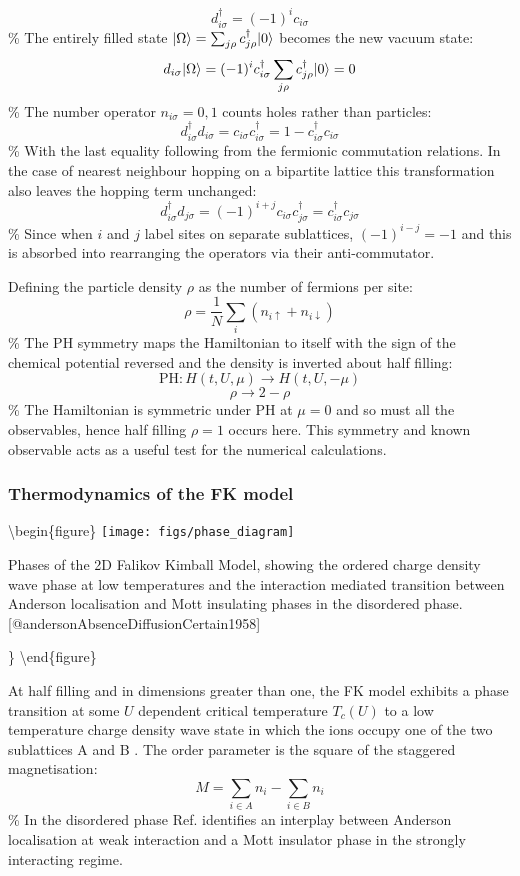 \[ d^\dagger_{i\sigma} = (-1)^i c_{i\sigma}\] \% The entirely filled state \(|\Omega\rangle = \sum_{j\rho} c^\dagger_{j\rho} |0\rangle\) becomes the new vacuum state: \[d_{i\sigma} |\Omega\rangle = (-1)^i c^\dagger_{i\sigma} \sum_{j\rho} c^\dagger_{j\rho} |0\rangle = 0\] \% The number operator \(n_{i\sigma} = 0,1\) counts holes rather than particles: \[ d^\dagger_{i\sigma} d_{i \sigma} = c_{i\sigma} c^\dagger_{i\sigma} = 1 - c^\dagger_{i\sigma} c_{i\sigma}\] \% With the last equality following from the fermionic commutation relations. In the case of nearest neighbour hopping on a bipartite lattice this transformation also leaves the hopping term unchanged: \[ d^\dagger_{i\sigma} d_{j \sigma} = (-1)^{i+j} c_{i\sigma} c^\dagger_{j\sigma} = c^\dagger_{i\sigma} c_{j\sigma} \] \% Since when \(i\) and \(j\) label sites on separate sublattices, \((-1)^{i-j} = -1\) and this is absorbed into rearranging the operators via their anti-commutator.

Defining the particle density \(\rho\) as the number of fermions per site: \[
    \rho = \frac{1}{N} \sum_i \left( n_{i \uparrow} + n_{i \downarrow} \right)
\] \% The PH symmetry maps the Hamiltonian to itself with the sign of the chemical potential reversed and the density is inverted about half filling: \[ \text{PH} : H(t, U, \mu) \rightarrow H(t, U, -\mu) \] \[ \rho \rightarrow 2 - \rho \] \% The Hamiltonian is symmetric under PH at \(\mu = 0\) and so must all the observables, hence half filling \(\rho = 1\) occurs here. This symmetry and known observable acts as a useful test for the numerical calculations.

\hypertarget{thermodynamics-of-the-fk-model}{%
\subsubsection{Thermodynamics of the FK model}\label{thermodynamics-of-the-fk-model}}

\textbackslash begin\{figure\} \centering \texttt{[image: figs/phase\_diagram]}

\caption{Phases of the 2D Falikov Kimball Model, showing the ordered charge density wave phase at low temperatures and the interaction mediated transition between Anderson localisation and Mott insulating phases in the disordered phase. [@andersonAbsenceDiffusionCertain1958]}

\} \label{fig:FK_phase_diagram} \textbackslash end\{figure\}

At half filling and in dimensions greater than one, the FK model exhibits a phase transition at some \(U\) dependent critical temperature \(T_c(U)\) to a low temperature charge density wave state in which the ions occupy one of the two sublattices A and B \autocite{maskaThermodynamicsTwodimensionalFalicovKimball2006}. The order parameter is the square of the staggered magnetisation: \[
M = \sum_{i \in A} n_i - \sum_{i \in B} n_i
\] \% In the disordered phase Ref. \autocite{andersonAbsenceDiffusionCertain1958} identifies an interplay between Anderson localisation at weak interaction and a Mott insulator phase in the strongly interacting regime.

